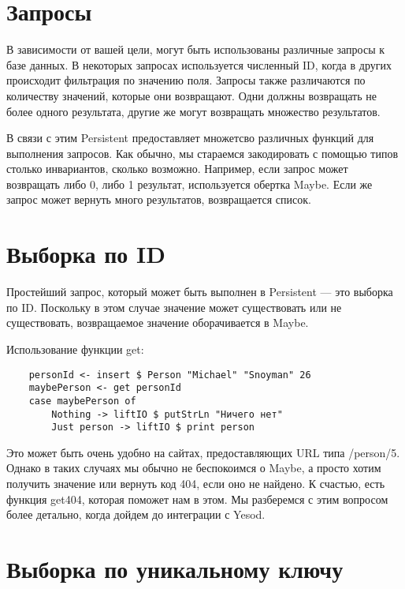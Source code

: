 \section{Запросы} %

В зависимости от вашей цели, могут быть использованы различные запросы к базе данных. В некоторых запросах используется численный ID, когда в других происходит фильтрация по значению поля. Запросы также различаются по количеству значений, которые они возвращают. Одни должны возвращать не более одного результата, другие же могут возвращать множество результатов.

В связи с этим Persistent предоставляет множетсво различных функций для выполнения запросов. Как обычно, мы стараемся закодировать с помощью типов столько инвариантов, сколько возможно. Например, если запрос может возвращать либо 0, либо 1 результат, используется обертка Maybe. Если же запрос может вернуть много результатов, возвращается список.

\section{Выборка по ID} %

Простейший запрос, который может быть выполнен в Persistent --- это выборка по ID. Поскольку в этом случае значение может существовать или не существовать, возвращаемое значение оборачивается в Maybe.

Использование функции get:

\begin{lstlisting}
    personId <- insert $ Person "Michael" "Snoyman" 26
    maybePerson <- get personId
    case maybePerson of
        Nothing -> liftIO $ putStrLn "Ничего нет"
        Just person -> liftIO $ print person
\end{lstlisting}%

Это может быть очень удобно на сайтах, предоставляющих URL типа /person/5. Однако в таких случаях мы обычно не беспокоимся о Maybe, а просто хотим получить значение или вернуть код 404, если оно не найдено. К счастью, есть функция get404, которая поможет нам в этом. Мы разберемся с этим вопросом более детально, когда дойдем до интеграции с Yesod. 

\section{Выборка по уникальному ключу} %

